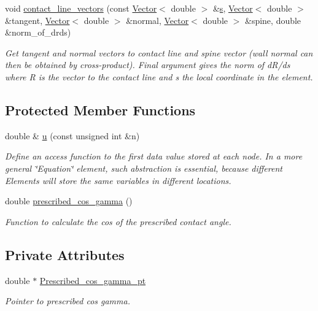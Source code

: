 \begin{DoxyCompactItemize}
void \hyperlink{classoomph_1_1YoungLaplaceContactAngleElement_af61855a9ea41833eed6ad3a519d68687}{contact\+\_\+line\+\_\+vectors} (const \hyperlink{classoomph_1_1Vector}{Vector}$<$ double $>$ \&\hyperlink{cfortran_8h_ab7123126e4885ef647dd9c6e3807a21c}{s}, \hyperlink{classoomph_1_1Vector}{Vector}$<$ double $>$ \&tangent, \hyperlink{classoomph_1_1Vector}{Vector}$<$ double $>$ \&normal, \hyperlink{classoomph_1_1Vector}{Vector}$<$ double $>$ \&spine, double \&norm\+\_\+of\+\_\+drds)
\begin{DoxyCompactList}\small\item\em Get tangent and normal vectors to contact line and spine vector (wall normal can then be obtained by cross-\/product). Final argument gives the norm of d\+R/ds where R is the vector to the contact line and s the local coordinate in the element. \end{DoxyCompactList}\end{DoxyCompactItemize}
\subsection*{Protected Member Functions}
\begin{DoxyCompactItemize}
\item 
double \& \hyperlink{classoomph_1_1YoungLaplaceContactAngleElement_ab2050063b575605e2e9469ddad7f9904}{u} (const unsigned int \&n)
\begin{DoxyCompactList}\small\item\em Define an access function to the first data value stored at each node. In a more general \char`\"{}\+Equation\char`\"{} element, such abstraction is essential, because different Elements will store the same variables in different locations. \end{DoxyCompactList}\item 
double \hyperlink{classoomph_1_1YoungLaplaceContactAngleElement_a7c48ab9660cdd1db7cda9fedcbae6bb9}{prescribed\+\_\+cos\+\_\+gamma} ()
\begin{DoxyCompactList}\small\item\em Function to calculate the cos of the prescribed contact angle. \end{DoxyCompactList}\end{DoxyCompactItemize}
\subsection*{Private Attributes}
\begin{DoxyCompactItemize}
\item 
double $\ast$ \hyperlink{classoomph_1_1YoungLaplaceContactAngleElement_ad93443e52c595b5c69301fdf92925554}{Prescribed\+\_\+cos\+\_\+gamma\+\_\+pt}
\begin{DoxyCompactList}\small\item\em Pointer to prescribed cos gamma. \end{DoxyCompactList}\end{DoxyCompactItemize}
